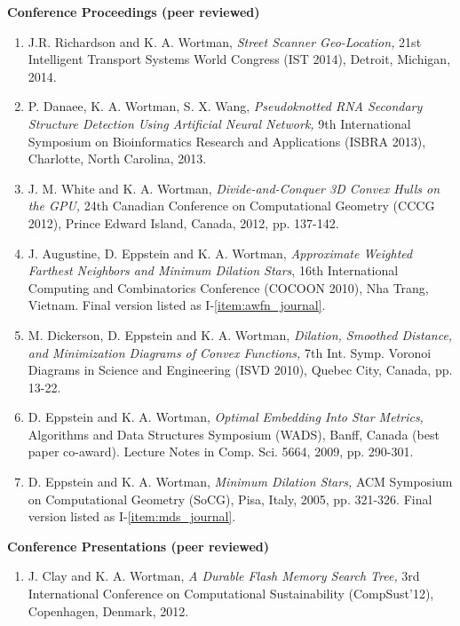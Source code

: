 \documentclass[11pt]{letter}
\begin{document}
\renewcommand{\labelenumi}{C-\arabic{enumi}.}
\textbf{Conference Proceedings (peer reviewed)}
\begin{enumerate}
\item \label{item:its14} J.R. Richardson and K. A. Wortman, \emph{Street Scanner Geo-Location,} 21st Intelligent Transport Systems World Congress (IST 2014), Detroit, Michigan, 2014.
\item \label{item:isbra13} P. Danaee, K. A. Wortman, S. X. Wang, \emph{Pseudoknotted RNA Secondary Structure Detection Using Artificial Neural Network,} 9th International Symposium on Bioinformatics Research and Applications (ISBRA 2013), Charlotte, North Carolina, 2013.
\item \label{item:cccg12} J. M. White and K. A. Wortman, \emph{Divide-and-Conquer 3D Convex Hulls on the GPU,} 24th Canadian Conference on Computational Geometry (CCCG 2012), Prince Edward Island, Canada, 2012, pp. 137-142.
\item \label{item:awfn_conference} J. Augustine, D. Eppstein and K. A. Wortman, \emph{Approximate Weighted Farthest Neighbors and Minimum Dilation Stars}, 16th International Computing and Combinatorics Conference (COCOON 2010), Nha Trang, Vietnam.  Final version listed as I-\ref{item:awfn_journal}.
\item M. Dickerson, D. Eppstein and K. A. Wortman, \emph{Dilation, Smoothed Distance, and Minimization Diagrams of Convex Functions,} 7th Int. Symp. Voronoi Diagrams in Science and Engineering (ISVD 2010), Quebec City, Canada, pp. 13-22.
\item \label{item:star_metrics} D. Eppstein and K. A. Wortman, \emph{Optimal Embedding Into Star Metrics,} Algorithms and Data Structures Symposium (WADS), Banff, Canada (best paper co-award).  Lecture Notes in Comp. Sci. 5664, 2009, pp. 290-301.
\item \label{item:mds_conference} D. Eppstein and K. A. Wortman, \emph{Minimum Dilation Stars,} ACM Symposium on Computational Geometry (SoCG), Pisa, Italy, 2005, pp. 321-326.  Final version listed as I-\ref{item:mds_journal}.
\end{enumerate} 

\renewcommand{\labelenumi}{P-\arabic{enumi}.}
\textbf{Conference Presentations (peer reviewed)}
\begin{enumerate}
\item \label{item:fmtree} J. Clay and K. A. Wortman, \emph{A Durable Flash Memory Search Tree,} 3rd International Conference on Computational Sustainability (CompSust'12), Copenhagen, Denmark, 2012.
\end{enumerate}
\end{document}
